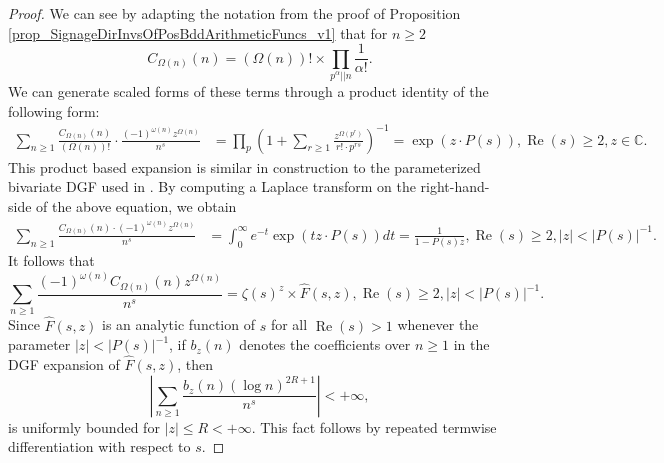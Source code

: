 \documentclass[11pt,reqno,a4letter]{article}
\numberwithin{figure}{section}
\numberwithin{table}{section}
\theoremstyle{plain}
\numberwithin{theorem}{section}
\theoremstyle{definition}
\renewcommand{\Re}{\operatorname{Re}}
\begin{document}
\begin{proof} 
We can see by adapting the notation from the proof of 
Proposition \ref{prop_SignageDirInvsOfPosBddArithmeticFuncs_v1} 
that for $n \geq 2$ 
\[
C_{\Omega(n)}(n) = (\Omega(n))! \times \prod_{p^{\alpha}||n} \frac{1}{\alpha!}. 
\]
We can generate scaled forms of these terms through a product identity of the following form: 
\begin{align*} 
\sum_{n \geq 1} \frac{C_{\Omega(n)}(n)}{(\Omega(n))!} \cdot 
     \frac{(-1)^{\omega(n)} z^{\Omega(n)}}{n^s} & = \prod_p \left(1 + \sum_{r \geq 1} 
     \frac{z^{\Omega(p^r)}}{r! \cdot p^{rs}}\right)^{-1} 
     = \exp\left(z \cdot P(s)\right), \Re(s) \geq 2, z \in \mathbb{C}. 
\end{align*} 
This product based expansion is similar in construction to the parameterized bivariate 
DGF used in \cite[\S 7.4]{MV}.
By computing a Laplace transform on the right-hand-side of the above equation, we obtain 
\begin{align*} 
\sum_{n \geq 1} \frac{C_{\Omega(n)}(n) \cdot (-1)^{\omega(n)} z^{\Omega(n)}}{n^s} & = 
     \int_0^{\infty} e^{-t} \exp\left(tz \cdot P(s)\right) dt = \frac{1}{1 - P(s) z}, 
     \Re(s) \geq 2, |z| < |P(s)|^{-1}. 
\end{align*} 
It follows that 
\[
\sum_{n \geq 1} \frac{(-1)^{\omega(n)} C_{\Omega(n)}(n) z^{\Omega(n)}}{n^s} = 
     \zeta(s)^z \times \widehat{F}(s, z), \Re(s) \geq 2, |z| < |P(s)|^{-1}. 
\]
Since $\widehat{F}(s, z)$ is an analytic function of $s$ for all $\Re(s) > 1$ 
whenever the parameter $|z| < |P(s)|^{-1}$, 
if $b_z(n)$ denotes the coefficients over $n \geq 1$ 
in the DGF expansion of $\widehat{F}(s, z)$, then 
\[
\left\lvert \sum_{n \geq 1} \frac{b_z(n) (\log n)^{2R+1}}{n^s} \right\rvert < +\infty, 
\]
is uniformly bounded for $|z| \leq R < +\infty$. This fact follows by repeated termwise differentiation 
with respect to $s$. 


\end{proof}
\end{document}
